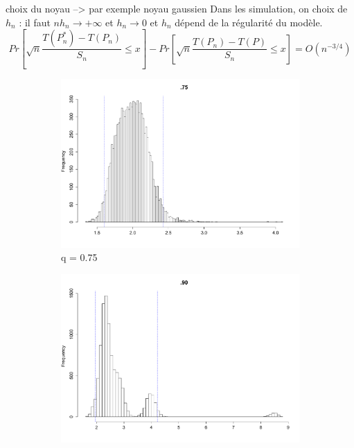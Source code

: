 \documentclass{article}
\renewcommand*{\(}{\left(}
\renewcommand*{\)}{\right)}
\begin{document}
choix du noyau --> par exemple noyau gaussien
Dans les simulation, on
choix de $h_n$ : il faut $nh_n \rightarrow +\infty$ et $h_n \rightarrow 0$ et $h_n$ dépend de la régularité du modèle.\\

\begin{equation*}
Pr\left[ \sqrt{n}\frac{T(P^*_n)-T(P_n)}{S_n} \leq x\right]-Pr\left[\sqrt{n}\frac{T(P_n)-T(P)}{S_n} \leq x \right]=O\(n^{-3/4}\)
\end{equation*}


\begin{figure}[H]
    \centering
    \begin{subfigure}[b]{0.3\textwidth}
        \includegraphics[width = \linewidth]{img/BootstrapSmooth-75-30.pdf}
        \caption{q = 0.75}
        \label{fig:smooth3B75}
    \end{subfigure}%
    \begin{subfigure}[b]{0.3\textwidth}
        \includegraphics[width = \linewidth]{img/BootstrapSmooth-90-30.pdf}

\end{subfigure}
\end{figure}
\end{document}
